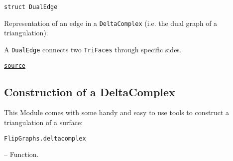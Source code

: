 \begin{adjustwidth}{2em}{0pt}


\begin{verbatim}
struct DualEdge
\end{verbatim}

Representation of an edge in a \texttt{DeltaComplex} (i.e. the dual graph of a triangulation).

A \texttt{DualEdge} connects two \texttt{TriFaces} through specific sides.



\href{https://github.com/schto223/FlipGraphs.jl/blob/490c01a7adf74b42f27dda05099165c47ae8133e/src/deltaComplex.jl#L4-L10}{\texttt{source}}


\end{adjustwidth}

\subsection{Construction of a DeltaComplex}



\label{9718644995923369106}{}


This Module comes with some handy and easy to use tools to construct a triangulation of a surface:


\hypertarget{5812016659056946666}{\texttt{FlipGraphs.deltacomplex}}  -- {Function.}

